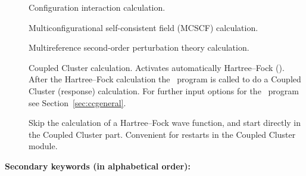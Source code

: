 \begin{description}
\item[]
  Configuration interaction calculation.

\item[]
  Multiconfigurational self-consistent field (MCSCF) calculation.

\item[]
  Multireference second-order perturbation theory calculation.

\item[]
  Coupled Cluster calculation. Activates automatically Hartree--Fock ().
  After the Hartree--Fock calculation
  the \cc\ program is called to do a Coupled Cluster (response) calculation.
  For further input options for the \cc\ program see Section~\ref{sec:ccgeneral}. 

\item[] Skip the calculation of a Hartree--Fock wave
  function, and start directly in the Coupled Cluster part. Convenient
  for restarts in the Coupled Cluster module.

\end{description}

{\bf Secondary keywords (in alphabetical order): }


